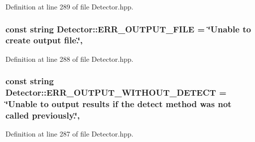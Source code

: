 Definition at line 289 of file Detector.\-hpp.

\hypertarget{classmultiscale_1_1analysis_1_1Detector_aab6b3a68e93cad9a93885e52f1c2ce04}{
\subsubsection[{E\-R\-R\-\_\-\-O\-U\-T\-P\-U\-T\-\_\-\-F\-I\-L\-E}]{\setlength{\rightskip}{0pt plus 5cm}const string Detector\-::\-E\-R\-R\-\_\-\-O\-U\-T\-P\-U\-T\-\_\-\-F\-I\-L\-E = \char`\"{}Unable to create output file.\char`\"{}\hspace{0.3cm}{\ttfamily [static]}, {\ttfamily [protected]}}}\label{classmultiscale_1_1analysis_1_1Detector_aab6b3a68e93cad9a93885e52f1c2ce04}


Definition at line 288 of file Detector.\-hpp.

\hypertarget{classmultiscale_1_1analysis_1_1Detector_a5837f0e4ffef6410774ff9bcda72238b}{
\subsubsection[{E\-R\-R\-\_\-\-O\-U\-T\-P\-U\-T\-\_\-\-W\-I\-T\-H\-O\-U\-T\-\_\-\-D\-E\-T\-E\-C\-T}]{\setlength{\rightskip}{0pt plus 5cm}const string Detector\-::\-E\-R\-R\-\_\-\-O\-U\-T\-P\-U\-T\-\_\-\-W\-I\-T\-H\-O\-U\-T\-\_\-\-D\-E\-T\-E\-C\-T = \char`\"{}Unable to output results if the {\bf detect} method was not called previously.\char`\"{}\hspace{0.3cm}{\ttfamily [static]}, {\ttfamily [protected]}}}\label{classmultiscale_1_1analysis_1_1Detector_a5837f0e4ffef6410774ff9bcda72238b}


Definition at line 287 of file Detector.\-hpp.

